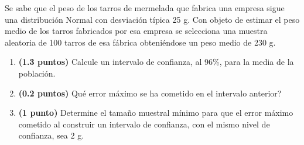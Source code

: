 
Se sabe que el peso de los tarros de mermelada que fabrica una empresa sigue una distribución Normal con desviación típica 25 g. Con objeto de estimar el peso medio de los tarros fabricados por esa empresa se selecciona una muestra aleatoria de 100 tarros de esa fábrica obteniéndose un peso medio de 230 g.
\begin{enumerate}[label=\alph*)]
\item \textbf{(1.3 puntos)} Calcule un intervalo de confianza, al 96\%, para la media de la población.
\item \textbf{(0.2 puntos)} \textquestiondown{}Qué error máximo se ha cometido en el intervalo anterior?
\item \textbf{(1 punto)} Determine el tamaño muestral mínimo para que el error máximo cometido al construir un intervalo de confianza, con el mismo nivel de confianza, sea 2 g.
\end{enumerate}
